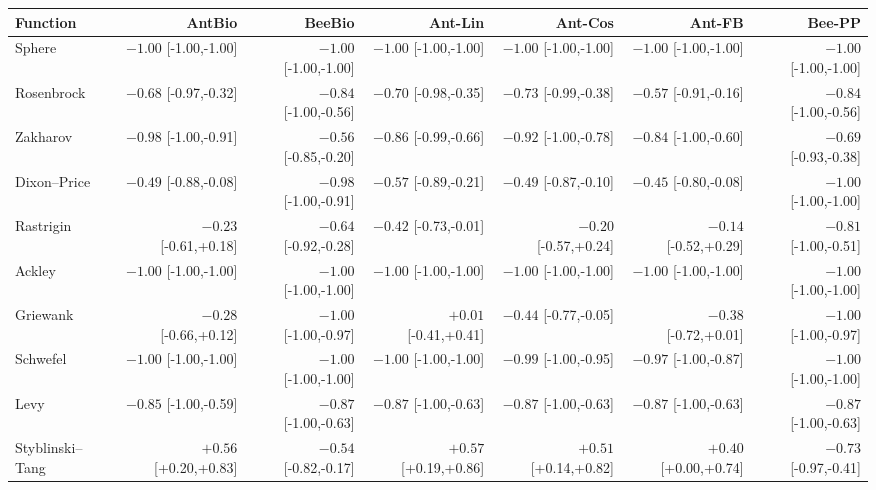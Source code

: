 \begin{tabular}{lrrrrrr}
\toprule
Function & AntBio & BeeBio & Ant-Lin & Ant-Cos & Ant-FB & Bee-PP \\
\midrule
Sphere & $-1.00$ {\tiny[-1.00,-1.00]} & $-1.00$ {\tiny[-1.00,-1.00]} & $-1.00$ {\tiny[-1.00,-1.00]} & $-1.00$ {\tiny[-1.00,-1.00]} & $-1.00$ {\tiny[-1.00,-1.00]} & $-1.00$ {\tiny[-1.00,-1.00]} \\
Rosenbrock & $-0.68$ {\tiny[-0.97,-0.32]} & $-0.84$ {\tiny[-1.00,-0.56]} & $-0.70$ {\tiny[-0.98,-0.35]} & $-0.73$ {\tiny[-0.99,-0.38]} & $-0.57$ {\tiny[-0.91,-0.16]} & $-0.84$ {\tiny[-1.00,-0.56]} \\
Zakharov & $-0.98$ {\tiny[-1.00,-0.91]} & $-0.56$ {\tiny[-0.85,-0.20]} & $-0.86$ {\tiny[-0.99,-0.66]} & $-0.92$ {\tiny[-1.00,-0.78]} & $-0.84$ {\tiny[-1.00,-0.60]} & $-0.69$ {\tiny[-0.93,-0.38]} \\
Dixon--Price & $-0.49$ {\tiny[-0.88,-0.08]} & $-0.98$ {\tiny[-1.00,-0.91]} & $-0.57$ {\tiny[-0.89,-0.21]} & $-0.49$ {\tiny[-0.87,-0.10]} & $-0.45$ {\tiny[-0.80,-0.08]} & $-1.00$ {\tiny[-1.00,-1.00]} \\
Rastrigin & $-0.23$ {\tiny[-0.61,+0.18]} & $-0.64$ {\tiny[-0.92,-0.28]} & $-0.42$ {\tiny[-0.73,-0.01]} & $-0.20$ {\tiny[-0.57,+0.24]} & $-0.14$ {\tiny[-0.52,+0.29]} & $-0.81$ {\tiny[-1.00,-0.51]} \\
Ackley & $-1.00$ {\tiny[-1.00,-1.00]} & $-1.00$ {\tiny[-1.00,-1.00]} & $-1.00$ {\tiny[-1.00,-1.00]} & $-1.00$ {\tiny[-1.00,-1.00]} & $-1.00$ {\tiny[-1.00,-1.00]} & $-1.00$ {\tiny[-1.00,-1.00]} \\
Griewank & $-0.28$ {\tiny[-0.66,+0.12]} & $-1.00$ {\tiny[-1.00,-0.97]} & $+0.01$ {\tiny[-0.41,+0.41]} & $-0.44$ {\tiny[-0.77,-0.05]} & $-0.38$ {\tiny[-0.72,+0.01]} & $-1.00$ {\tiny[-1.00,-0.97]} \\
Schwefel & $-1.00$ {\tiny[-1.00,-1.00]} & $-1.00$ {\tiny[-1.00,-1.00]} & $-1.00$ {\tiny[-1.00,-1.00]} & $-0.99$ {\tiny[-1.00,-0.95]} & $-0.97$ {\tiny[-1.00,-0.87]} & $-1.00$ {\tiny[-1.00,-1.00]} \\
Levy & $-0.85$ {\tiny[-1.00,-0.59]} & $-0.87$ {\tiny[-1.00,-0.63]} & $-0.87$ {\tiny[-1.00,-0.63]} & $-0.87$ {\tiny[-1.00,-0.63]} & $-0.87$ {\tiny[-1.00,-0.63]} & $-0.87$ {\tiny[-1.00,-0.63]} \\
Styblinski--Tang & $+0.56$ {\tiny[+0.20,+0.83]} & $-0.54$ {\tiny[-0.82,-0.17]} & $+0.57$ {\tiny[+0.19,+0.86]} & $+0.51$ {\tiny[+0.14,+0.82]} & $+0.40$ {\tiny[+0.00,+0.74]} & $-0.73$ {\tiny[-0.97,-0.41]} \\
\bottomrule
\end{tabular}
